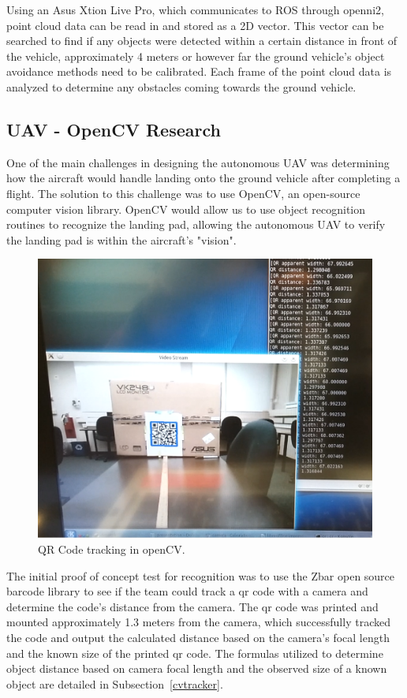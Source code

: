 Using an Asus Xtion Live Pro, which communicates to ROS through openni2, point cloud data can be read in and stored as a 2D vector. This vector can be searched to find if any objects were detected within a certain distance in front of the vehicle, approximately 4 meters or however far the ground vehicle's object avoidance methods need to be calibrated. Each frame of the point cloud data is analyzed to determine any obstacles coming towards the ground vehicle.




\subsection{UAV - OpenCV Research}
One of the main challenges in designing the autonomous UAV was determining how the aircraft would handle landing onto the ground vehicle after completing a flight. The solution to this challenge was to use OpenCV, an open-source computer vision library. OpenCV would allow us to use object recognition routines to recognize the landing pad, allowing the autonomous UAV to verify the landing pad is within the aircraft's "vision".

\begin{figure}[!h]
\begin{center}
\includegraphics[width=.8\textwidth]{resources/img/qr}
\end{center}
\caption{QR Code tracking in openCV.\label{qr}}
\end{figure}

The initial proof of concept test for recognition was to use the Zbar open source barcode library to see if the team could track a qr code with a camera and determine the code's distance from the camera. The qr code was printed and mounted approximately 1.3 meters from the camera, which successfully tracked the code and output the calculated distance based on the camera's focal length and the known size of the printed qr code. The formulas utilized to determine object distance based on camera focal length and the observed size of a known object are detailed in Subsection~\ref{cvtracker}.

